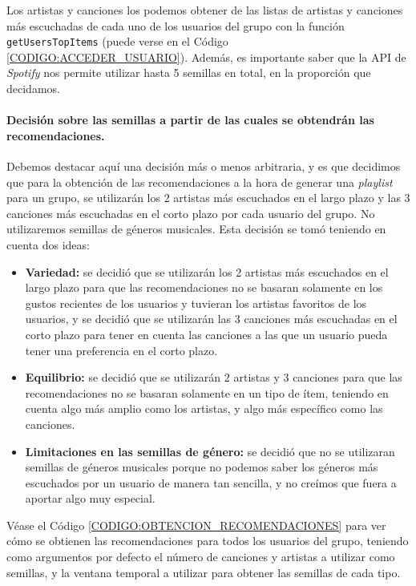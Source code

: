 Los artistas y canciones los podemos obtener de las listas de artistas y canciones más escuchadas
de cada uno de los usuarios del grupo con la función \texttt{getUsersTopItems} (puede verse en el Código \ref{CODIGO:ACCEDER_USUARIO}).
Además, es importante saber que la API de \textit{Spotify} nos permite utilizar hasta 5 semillas en total, en la proporción que decidamos.

\paragraph{Decisión sobre las semillas a partir de las cuales se obtendrán las recomendaciones.}

Debemos destacar aquí una decisión más o menos arbitraria, y es que decidimos que para la obtención de las recomendaciones a la hora de generar
una \textit{playlist} para un grupo, se utilizarán los 2 artistas más escuchados en el largo plazo y las 3 canciones más escuchadas en el corto plazo
por cada usuario del grupo. No utilizaremos semillas de géneros musicales. Esta decisión se tomó teniendo en cuenta dos ideas:

\begin{itemize}
  \item \textbf{Variedad:} se decidió que se utilizarán los 2 artistas más escuchados en el largo plazo para que las recomendaciones no se basaran
  solamente en los gustos recientes de los usuarios y tuvieran los artistas favoritos de los usuarios, y se decidió que se utilizarán 
  las 3 canciones más escuchadas en el corto plazo para tener en cuenta las canciones a las que un usuario pueda tener una preferencia en el corto plazo.
  \item \textbf{Equilibrio:} se decidió que se utilizarán 2 artistas y 3 canciones para que las recomendaciones no se basaran solamente en un tipo
  de ítem, teniendo en cuenta algo más amplio como los artistas, y algo más específico como las canciones.
  \item \textbf{Limitaciones en las semillas de género:} se decidió que no se utilizaran semillas de géneros musicales porque no podemos saber los géneros más escuchados
  por un usuario de manera tan sencilla, y no creímos que fuera a aportar algo muy especial.
\end{itemize}

Véase el Código \ref{CODIGO:OBTENCION_RECOMENDACIONES} para ver cómo se obtienen las recomendaciones para todos los usuarios del grupo, 
teniendo como argumentos por defecto el número de canciones y artistas a utilizar como semillas, y 
la ventana temporal a utilizar para obtener las semillas de cada tipo.


